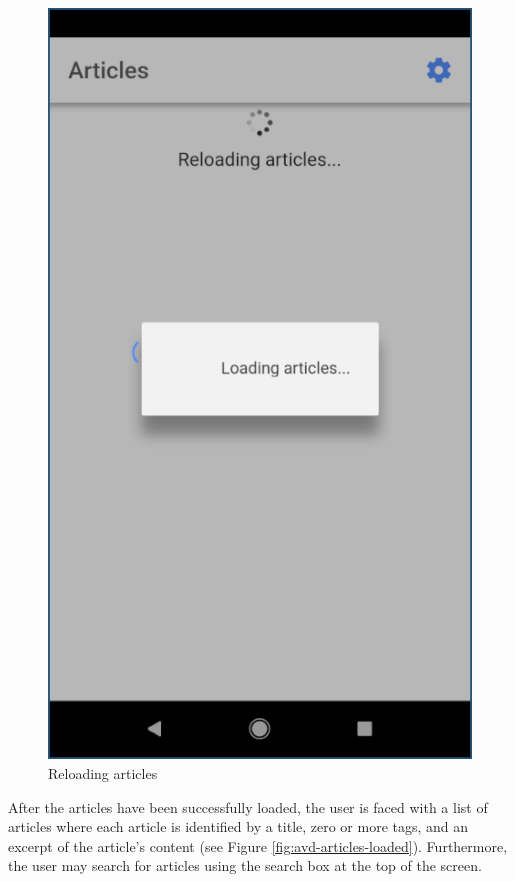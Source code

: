 \documentclass[12pt]{report}
\begin{document}
\begin{figure}
    \centering
    \includegraphics[scale=0.5]{images/avd-articles-loading.png}
    \caption{Reloading articles}
    \label{fig:avd-articles-loading}
\end{figure}

After the articles have been successfully loaded, the user is faced with a list
of articles where each article is identified by a title, zero or more tags, and
an excerpt of the article's content (see Figure \ref{fig:avd-articles-loaded}).
Furthermore, the user may search for articles using the search box at the top of
the screen.
\end{document}
